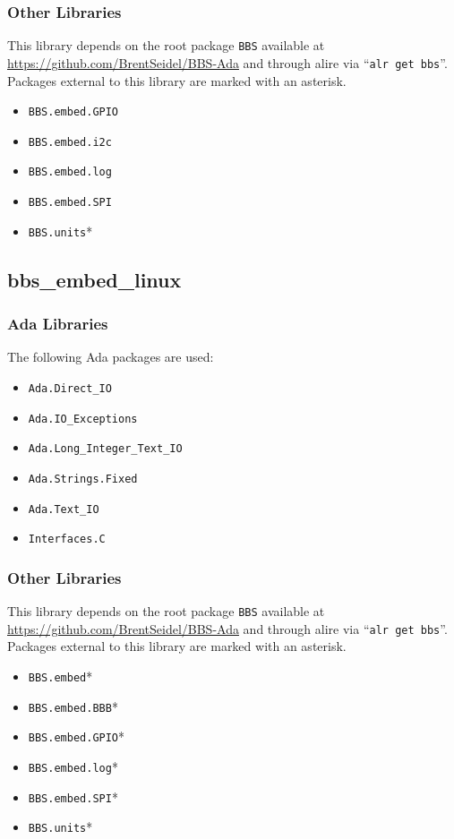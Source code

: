 \documentclass[10pt, openany]{book}
\newcommand{\package}[1]{\texttt{#1}}
\newcommand{\keyword}[1]{\texttt{#1}}
\begin{document}
\subsubsection{Other Libraries}
This library depends on the root package \package{BBS} available at \url{https://github.com/BrentSeidel/BBS-Ada} and through alire via ``\keyword{alr get bbs}''.  Packages external to this library are marked with an asterisk.
\begin{itemize}
  \item \package{BBS.embed.GPIO}
  \item \package{BBS.embed.i2c}
  \item \package{BBS.embed.log}
  \item \package{BBS.embed.SPI}
  \item \package{BBS.units}*
\end{itemize}

\subsection{bbs\_embed\_linux}
\subsubsection{Ada Libraries}
The following Ada packages are used:
\begin{itemize}
  \item \package{Ada.Direct\_IO}
  \item \package{Ada.IO\_Exceptions}
  \item \package{Ada.Long\_Integer\_Text\_IO}
  \item \package{Ada.Strings.Fixed}
  \item \package{Ada.Text\_IO}
  \item \package{Interfaces.C}
\end{itemize}
\subsubsection{Other Libraries}
This library depends on the root package \package{BBS} available at \url{https://github.com/BrentSeidel/BBS-Ada} and through alire via ``\keyword{alr get bbs}''.  Packages external to this library are marked with an asterisk.
\begin{itemize}
  \item \package{BBS.embed}*
  \item \package{BBS.embed.BBB}*
  \item \package{BBS.embed.GPIO}*
  \item \package{BBS.embed.log}*
  \item \package{BBS.embed.SPI}*
  \item \package{BBS.units}*
\end{itemize}
\end{document}
